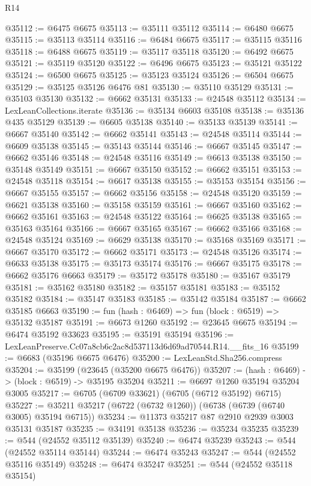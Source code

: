\begin{lexlean}{R14}
\begin{coremodule}
@35112 := @6475 @6675
@35113 := @35111 @35112
@35114 := @6480 @6675
@35115 := @35113 @35114
@35116 := @6484 @6675
@35117 := @35115 @35116
@35118 := @6488 @6675
@35119 := @35117 @35118
@35120 := @6492 @6675
@35121 := @35119 @35120
@35122 := @6496 @6675
@35123 := @35121 @35122
@35124 := @6500 @6675
@35125 := @35123 @35124
@35126 := @6504 @6675
@35129 := @35125 @35126 @6476 @81
@35130 := @35110 @35129
@35131 := @35103 @35130
@35132 := @6662 @35131
@35133 := @24548 @35112
@35134 := LexLeanCollections.iterate
@35136 := @35134 @6603 @35108
@35138 := @35136 @435 @35129
@35139 := @6605 @35138
@35140 := @35133 @35139
@35141 := @6667 @35140
@35142 := @6662 @35141
@35143 := @24548 @35114
@35144 := @6609 @35138
@35145 := @35143 @35144
@35146 := @6667 @35145
@35147 := @6662 @35146
@35148 := @24548 @35116
@35149 := @6613 @35138
@35150 := @35148 @35149
@35151 := @6667 @35150
@35152 := @6662 @35151
@35153 := @24548 @35118
@35154 := @6617 @35138
@35155 := @35153 @35154
@35156 := @6667 @35155
@35157 := @6662 @35156
@35158 := @24548 @35120
@35159 := @6621 @35138
@35160 := @35158 @35159
@35161 := @6667 @35160
@35162 := @6662 @35161
@35163 := @24548 @35122
@35164 := @6625 @35138
@35165 := @35163 @35164
@35166 := @6667 @35165
@35167 := @6662 @35166
@35168 := @24548 @35124
@35169 := @6629 @35138
@35170 := @35168 @35169
@35171 := @6667 @35170
@35172 := @6662 @35171
@35173 := @24548 @35126
@35174 := @6633 @35138
@35175 := @35173 @35174
@35176 := @6667 @35175
@35178 := @6662 @35176 @6663
@35179 := @35172 @35178
@35180 := @35167 @35179
@35181 := @35162 @35180
@35182 := @35157 @35181
@35183 := @35152 @35182
@35184 := @35147 @35183
@35185 := @35142 @35184
@35187 := @6662 @35185 @6663
@35190 := fun (hash : @6469) => fun (block : @6519) => @35132 @35187
@35191 := @6673 @1260
@35192 := @23645 @6675
@35194 := @6474 @35192 @33623
@35195 := @35191 @35194
@35196 := LexLeanPreserve.Cc07a8cb6c2ac8d537113d6d69ad70544.R14.__fits_16
@35199 := @6683 (@35196 @6675 @6476)
@35200 := LexLeanStd.Sha256.compress
@35204 := @35199 (@23645 (@35200 @6675 @6476))
@35207 := (hash : @6469) -> (block : @6519) -> @35195 @35204
@35211 := @6697 @1260 @35194 @35204 @3005
@35217 := @6705 (@6709 @33621) (@6705 (@6712 @35192) @6715)
@35227 := @35211 @35217 (@6722 (@6732 @1260)) (@6738 (@6739 (@6740 @3005) @35194 @6715))
@35234 := @11373 @35217 @87 @2910 @2939 @3003 @35131 @35187
@35235 := @34191 @35138
@35236 := @35234 @35235
@35239 := @544 (@24552 @35112 @35139)
@35240 := @6474 @35239
@35243 := @544 (@24552 @35114 @35144)
@35244 := @6474 @35243
@35247 := @544 (@24552 @35116 @35149)
@35248 := @6474 @35247
@35251 := @544 (@24552 @35118 @35154)

\end{coremodule}
\end{lexlean}
